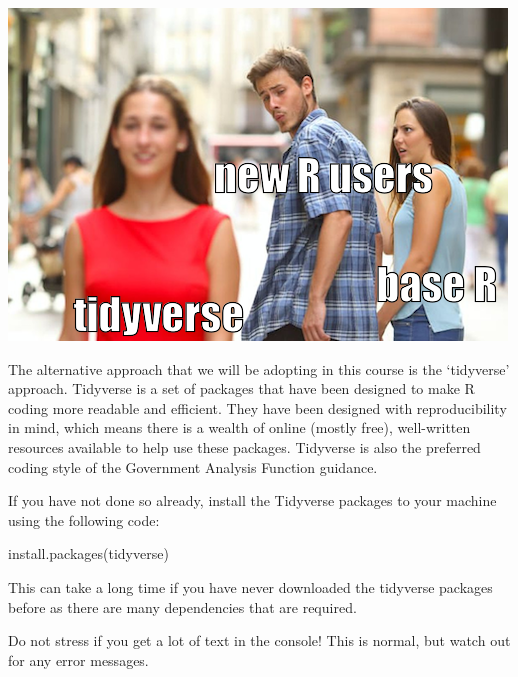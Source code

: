 \documentclass[
  letterpaper,
  DIV=11,
  numbers=noendperiod]{scrreprt}
\newenvironment{Shaded}{\begin{snugshade}}{\end{snugshade}}
\newcommand{\FunctionTok}[1]{\textcolor[rgb]{0.28,0.35,0.67}{#1}}
\newcommand{\NormalTok}[1]{\textcolor[rgb]{0.00,0.23,0.31}{#1}}
\newcommand{\StringTok}[1]{\textcolor[rgb]{0.13,0.47,0.30}{#1}}
\begin{document}
\includegraphics{open_explore_data_files/figure-pdf/boyfriend meme-1.png}

The alternative approach that we will be adopting in this course is the
`tidyverse' approach. Tidyverse is a set of packages that have been
designed to make R coding more readable and efficient. They have been
designed with reproducibility in mind, which means there is a wealth of
online (mostly free), well-written resources available to help use these
packages. Tidyverse is also the preferred coding style of the Government
Analysis Function guidance.

If you have not done so already, install the Tidyverse packages to your
machine using the following code:

\begin{Shaded}
\begin{Highlighting}[]
\FunctionTok{install.packages}\NormalTok{(}\StringTok{\textquotesingle{}tidyverse\textquotesingle{}}\NormalTok{)}
\end{Highlighting}
\end{Shaded}

\begin{tcolorbox}[enhanced jigsaw, bottomrule=.15mm, left=2mm, leftrule=.75mm, bottomtitle=1mm, coltitle=black, colbacktitle=quarto-callout-warning-color!10!white, toptitle=1mm, arc=.35mm, breakable, title=\textcolor{quarto-callout-warning-color}{\faExclamationTriangle}\hspace{0.5em}{Warning}, rightrule=.15mm, toprule=.15mm, opacityback=0, opacitybacktitle=0.6, titlerule=0mm, colback=white, colframe=quarto-callout-warning-color-frame]

This can take a long time if you have never downloaded the tidyverse
packages before as there are many dependencies that are required.

Do not stress if you get a lot of text in the console! This is normal,
but watch out for any error messages.

\end{tcolorbox}
\end{document}
